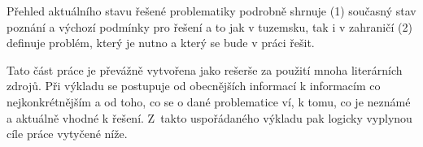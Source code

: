 Přehled aktuálního stavu řešené problematiky podrobně shrnuje (1) současný stav poznání a výchozí podmínky pro řešení a to jak v tuzemsku, tak i v zahraničí (2) definuje problém, který je nutno a který se bude v práci řešit.

Tato část práce je převážně vytvořena jako rešerše za použití mnoha literárních zdrojů. 
Při výkladu se postupuje od obecnějších informací k informacím co nejkonkrétnějším a od toho, co se o dané problematice ví, k tomu, co je neznámé a aktuálně vhodné k řešení. Z~takto uspořádaného výkladu pak logicky vyplynou cíle práce vytyčené níže.